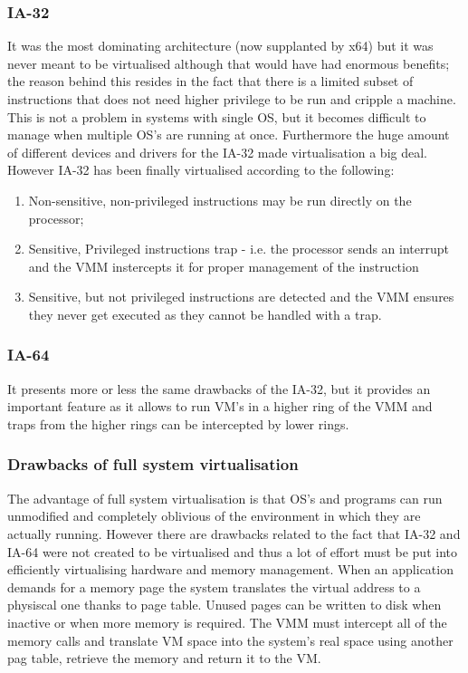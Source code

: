 \subsubsection{IA-32} 
It was the most dominating architecture (now supplanted by x64) but it was never meant to be virtualised although that
would have had enormous benefits; the reason behind this resides in the fact that there is a limited subset of
instructions that does not need higher privilege to be run and cripple a machine. This is not a problem in systems 
with single OS, but it becomes difficult to manage when multiple OS's are running at once. Furthermore the huge amount 
of different devices and drivers for the IA-32 made virtualisation a big deal. However IA-32 has been finally
virtualised according to the following:
\begin{enumerate} 
    \item Non-sensitive,
        non-privileged instructions may be run directly on the processor;
    \item Sensitive, Privileged instructions trap - i.e. the processor sends an interrupt and the VMM instercepts it 
        for proper management of the instruction
    \item Sensitive, but not privileged instructions are detected and the VMM ensures they never get executed as they 
        cannot be handled with a trap.
\end{enumerate}
\subsubsection{IA-64} 
It presents more or less the same drawbacks of the
IA-32, but it provides an important feature as it allows to run VM's in a higher ring of the VMM and traps from the
higher rings can be intercepted by lower rings.
\subsubsection{Drawbacks of full system virtualisation} 
The advantage of full system virtualisation is that OS's and programs can run unmodified and completely oblivious of the
environment in which they are actually running. However there are drawbacks related to the fact that IA-32 and IA-64
were not created to be virtualised and thus a lot of effort must be put into efficiently virtualising hardware and
memory management. When an application demands for a memory page the system translates the virtual address to a
physiscal one thanks to page table. Unused pages can be written to disk when inactive or when more memory is required.
The VMM must intercept all of the memory calls and translate VM space into the system's real space using another pag table,
retrieve the memory and return it to the VM.
